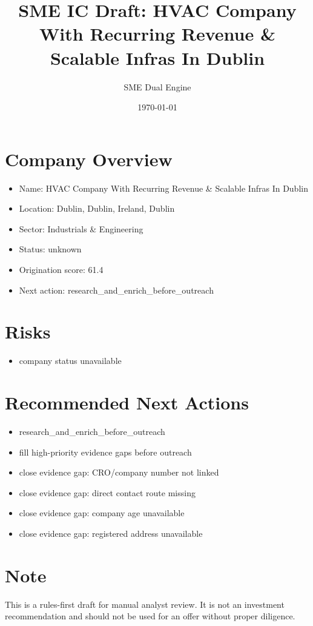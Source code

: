 \documentclass[11pt,a4paper]{article}
\title{SME IC Draft: HVAC Company With Recurring Revenue \& Scalable Infras In Dublin}
\author{SME Dual Engine}
\date{\today}
\begin{document}
\maketitle
\section*{Company Overview}
\begin{itemize}[leftmargin=1.4em]
\item Name: HVAC Company With Recurring Revenue \& Scalable Infras In Dublin
\item Location: Dublin, Dublin, Ireland, Dublin
\item Sector: Industrials \& Engineering
\item Status: unknown
\item Origination score: 61.4
\item Next action: research\_and\_enrich\_before\_outreach
\end{itemize}
\section*{Risks}
\begin{itemize}[leftmargin=1.4em]
\item company status unavailable
\end{itemize}
\section*{Recommended Next Actions}
\begin{itemize}[leftmargin=1.4em]
\item research\_and\_enrich\_before\_outreach
\item fill high-priority evidence gaps before outreach
\item close evidence gap: CRO/company number not linked
\item close evidence gap: direct contact route missing
\item close evidence gap: company age unavailable
\item close evidence gap: registered address unavailable
\end{itemize}
\section*{Note}
This is a rules-first draft for manual analyst review. It is not an investment
recommendation and should not be used for an offer without proper diligence.
\end{document}
